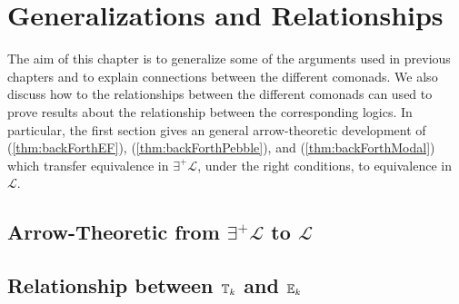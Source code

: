 \chapter{Generalizations and Relationships}
The aim of this chapter is to generalize some of the arguments used in previous chapters and to explain connections between the different comonads. We also discuss how to the relationships between the different comonads can used to prove results about the relationship between the corresponding logics. In particular, the first section gives an general arrow-theoretic development of (\ref{thm:backForthEF}), (\ref{thm:backForthPebble}), and (\ref{thm:backForthModal}) which transfer equivalence in $\exists^{+}\mathcal{L}$, under the right conditions, to equivalence in $\mathcal{L}$. 
\section{Arrow-Theoretic from $\exists^{+}\mathcal{L}$ to $\mathcal{L}$}
\section{Relationship between ${\mathbb{T}_{k}}$ and ${\mathbb{E}_{k}}$}
